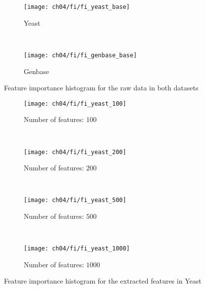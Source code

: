 \begin{figure}[t]
    \centering
    \begin{subfigure}[b]{0.45\textwidth}
        \texttt{[image: ch04/fi/fi\_yeast\_base]}
        \caption{Yeast}
        \label{results:fi_yeast_base}
    \end{subfigure}
    ~ %
    \begin{subfigure}[b]{0.45\textwidth}
        \texttt{[image: ch04/fi/fi\_genbase\_base]}
        \caption{Genbase}
        \label{results:fi_genbase_base}
    \end{subfigure}
    \caption{Feature importance histogram for the raw data in both datasets}
    \label{results:fi_base}
\end{figure}


\begin{figure}[h!]
    \centering
    \begin{subfigure}[b]{0.45\textwidth}
        \texttt{[image: ch04/fi/fi\_yeast\_100]}
        \caption{Number of features: $100$}
        \label{results:fi_yeast_100}
    \end{subfigure}
    ~ %
    \begin{subfigure}[b]{0.45\textwidth}
        \texttt{[image: ch04/fi/fi\_yeast\_200]}
        \caption{Number of features: $200$}
        \label{results:fi_yeast_200}
    \end{subfigure}
    ~ %
    \begin{subfigure}[b]{0.45\textwidth}
        \texttt{[image: ch04/fi/fi\_yeast\_500]}
        \caption{Number of features: $500$}
        \label{results:fi_yeast_500}
    \end{subfigure}
    ~ %
    \begin{subfigure}[b]{0.45\textwidth}
        \texttt{[image: ch04/fi/fi\_yeast\_1000]}
        \caption{Number of features: $1000$}
        \label{results:fi_yeast_1000}
    \end{subfigure}
    \caption{Feature importance histogram for the extracted features in Yeast}
    \label{results:fi_yeast}
\end{figure}

